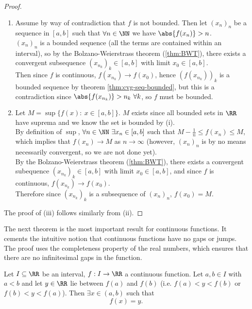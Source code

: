 \documentclass[../real_analysis.tex]{subfiles}
\begin{document}
            \begin{proof}\\
                \begin{enumerate}[label={\upshape(\roman*)}]
                    \item Assume by way of contradiction that $f$ is not bounded. Then let $(x_n)_n$ be a sequence in $[a,b]$ such that $\forall n\in\NN$ we have $\abs{f(x_n)}>n$.\\
                    $(x_n)_n$ is a bounded sequence (all the terms are contained within an interval), so by the Bolzano-Weierstrass theorem (\ref{thm:BWT}), there exists a convergent subsequence $(x_{n_k})_k\in[a,b]$ with limit $x_0\in[a,b]$.\\
                    Then since $f$ is continuous, $f(x_{n_k})\to f(x_0)$, hence $(f(x_{n_k}))_k$ is a bounded sequence by theorem \ref{thm:cvg-seq-bounded}, but this is a contradiction since $\abs{f(x_{n_k})}>n_k\ \forall k$, so $f$ must be bounded.
                    \item Let $M=\sup\{f(x):\ x\in[a,b]\}$. $M$ exists since all bounded sets in $\RR$ have suprema and we know the set is bounded by (i).\\
                    By definition of $\sup$, $\forall n\in\NN\ \exists x_n\in[a,b]$ such that $M-\frac{1}{n}\leq f(x_n)\leq M$, which implies that $f(x_n)\to M$ as $n\to\infty$ (however, $(x_n)_n$ is by no means necessarily convergent, so we are not done yet).\\
                    By the Bolzano-Weierstrass theorem (\ref{thm:BWT}), there exists a convergent subequence $(x_{n_k})_k\in[a,b]$ with limit $x_0\in[a,b]$, and since $f$ is continuous, $f(x_{n_k})\to f(x_0)$.\\
                    Therefore since $(x_{n_k})_k$ is a subsequence of $(x_n)_n$, $f(x_0)=M$.
                \end{enumerate}
                The proof of (iii) follows similarly from (ii).
            \end{proof}
            The next theorem is the most important result for continuous functions. It cements the intuitive notion that continuous functions have no gaps or jumps. The proof uses the completeness property of the real numbers, which ensures that there are no infinitesimal gaps in the function.
            \begin{theorem}\label{thm:ivt}
                Let $I\subseteq\RR$ be an interval, $f: I\to\RR$ a continuous function. Let $a,b\in I$ with $a<b$ and let $y\in\RR$ lie between $f(a)$ and $f(b)$ (i.e. $f(a)<y<f(b)$ or $f(b)<y<f(a)$). Then $\exists x\in(a,b)$ such that
                \begin{equation}
                    f(x)=y.
                \end{equation}
            \end{theorem}
\end{document}
